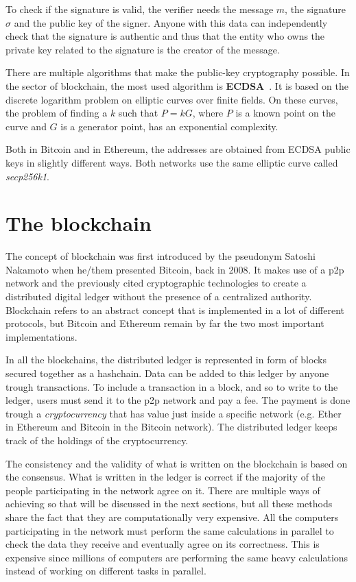 To check if the signature is valid, the verifier needs the message $m$, the signature $\sigma$ and the public key of the signer. Anyone with this data can independently check that the signature is authentic and thus that the entity who owns the private key related to the signature is the creator of the message. 

There are multiple algorithms that make the public-key cryptography possible. In the sector of blockchain, the most used algorithm is \textbf{ECDSA}~\cite{ecdsa}. It is based on the discrete logarithm problem on elliptic curves over finite fields. On these curves, the problem of finding a $k$ such that $P=kG$, where $P$ is a known point on the curve and $G$ is a generator point, has an exponential complexity. 

Both in Bitcoin and in Ethereum, the addresses are obtained from ECDSA public keys in slightly different ways. Both networks use the same elliptic curve called \textit{secp256k1}.



\section{The blockchain}

The concept of blockchain was first introduced by the pseudonym Satoshi Nakamoto when he/them presented Bitcoin, back in 2008. It makes use of a p2p network and the previously cited cryptographic technologies to create a distributed digital ledger without the presence of a centralized authority. Blockchain refers to an abstract concept that is implemented in a lot of different protocols, but Bitcoin and Ethereum remain by far the two most important implementations.

In all the blockchains, the distributed ledger is represented in form of blocks secured together as a hashchain. Data can be added to this ledger by anyone trough transactions. To include a transaction in a block, and so to write to the ledger, users must send it to the p2p network and pay a fee. The payment is done trough a \textit{cryptocurrency} that has value just inside a specific network (e.g. Ether in Ethereum and Bitcoin in the Bitcoin network). The distributed ledger keeps track of the holdings of the cryptocurrency.

The consistency and the validity of what is written on the blockchain is based on the consensus. What is written in the ledger is correct if the majority of the people participating in the network agree on it. There are multiple ways of achieving so that will be discussed in the next sections, but all these methods share the fact that they are computationally very expensive. All the computers participating in the network must perform the same calculations in parallel to check the data they receive and eventually agree on its correctness. This is expensive since millions of computers are performing the same heavy calculations instead of working on different tasks in parallel. 

